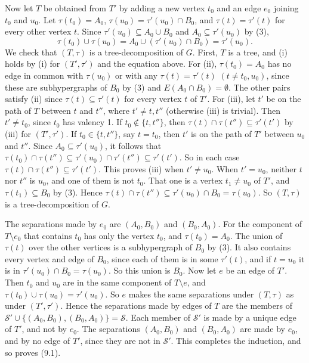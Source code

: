 {Now let $T$ be obtained from $T'$ by adding a new vertex $t_0$ and an edge $e_0$ joining $t_0$ and $u_0$. Let $\tau(t_0) = A_0$, $\tau(u_0) = \tau'(u_0) \cap B_0$, and $\tau(t) = \tau'(t)$ for every other vertex $t$. Since $\tau'(u_0) \subseteq A_0 \cup B_0$ and $A_0 \subseteq \tau'(u_0)$ by (3),
\begin{equation*}
\tau(t_0) \cup \tau(u_0) = A_0 \cup (\tau'(u_0) \cap B_0) = \tau'(u_0).
\end{equation*}
We check that $(T, \tau)$ is a tree-decomposition of $G$. First, $T$ is a tree, and (i) holds by (i) for $(T', \tau')$ and the equation above. For (ii), $\tau(t_0) = A_0$ has no edge in common with $\tau(u_0)$ or with any $\tau(t) = \tau'(t)$ $(t \ne t_0, u_0)$, since these are subhypergraphs of $B_0$ by (3) and $E(A_0 \cap B_0) = \emptyset$. The other pairs satisfy (ii) since $\tau(t) \subseteq \tau'(t)$ for every vertex $t$ of $T'$. For (iii), let $t'$ be on the path of $T$ between $t$ and $t''$, where $t' \ne t, t''$ (otherwise (iii) is trivial). Then $t' \ne t_0$, since $t_0$ has valency 1. If $t_0 \notin \{t, t''\}$, then $\tau(t) \cap \tau(t'') \subseteq \tau'(t')$ by (iii) for $(T', \tau')$. If $t_0 \in \{t, t''\}$, say $t = t_0$, then $t'$ is on the path of $T'$ between $u_0$ and $t''$. Since $A_0 \subseteq \tau'(u_0)$, it follows that $\tau(t_0) \cap \tau(t'') \subseteq \tau'(u_0) \cap \tau'(t'') \subseteq \tau'(t')$. So in each case $\tau(t) \cap \tau(t'') \subseteq \tau'(t')$. This proves (iii) when $t' \ne u_0$. When $t' = u_0$, neither $t$ nor $t''$ is $u_0$, and one of them is not $t_0$. That one is a vertex $t_1 \ne u_0$ of $T'$, and $\tau(t_1) \subseteq B_0$ by (3). Hence $\tau(t) \cap \tau(t'') \subseteq \tau'(u_0) \cap B_0 = \tau(u_0)$. So $(T, \tau)$ is a tree-decomposition of $G$.

The separations made by $e_0$ are $(A_0, B_0)$ and $(B_0, A_0)$. For the component of $T \setminus e_0$ that contains $t_0$ has only the vertex $t_0$, and $\tau(t_0) = A_0$. The union of $\tau(t)$ over the other vertices is a subhypergraph of $B_0$ by (3). It also contains every vertex and edge of $B_0$, since each of them is in some $\tau'(t)$, and if $t = u_0$ it is in $\tau'(u_0) \cap B_0 = \tau(u_0)$. So this union is $B_0$. Now let $e$ be an edge of $T'$. Then $t_0$ and $u_0$ are in the same component of $T \setminus e$, and $\tau(t_0) \cup \tau(u_0) = \tau'(u_0)$. So $e$ makes the same separations under $(T, \tau)$ as under $(T', \tau')$. Hence the separations made by edges of $T$ are the members of $\mathscr{S}' \cup \{(A_0, B_0), (B_0, A_0)\} = \mathscr{S}$. Each member of $\mathscr{S}'$ is made by a unique edge of $T'$, and not by $e_0$. The separations $(A_0, B_0)$ and $(B_0, A_0)$ are made by $e_0$, and by no edge of $T'$, since they are not in $\mathscr{S}'$. This completes the induction, and so proves (9.1).}

